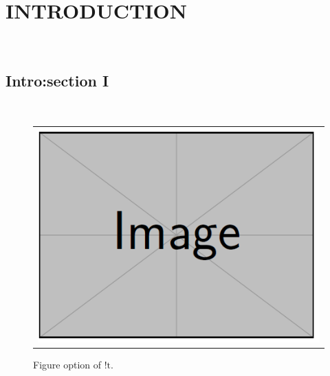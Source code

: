 \documentclass[doctor]{snuee}
\begin{document}



\chapter{INTRODUCTION}
\lipsum[1-4]~\cite{anderson1964hard}

\section{Intro:section I}
\lipsum[1-4]~\cite{anderson1964hard}

\begin{figure}[!t]
	{
	\begin{center}
		\begin{tabular}{c}
			\includegraphics[width=0.9\linewidth]{dummy.png}
		\end{tabular}
	\end{center}
	}
	\caption[dummy image FIXME1]{Figure option of $!\text{t}$.}
\label{dummy_img1}
\end{figure}
\end{document}
